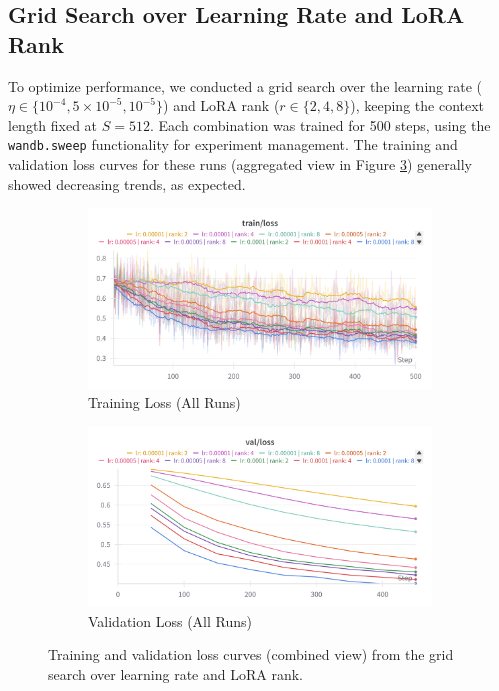 \documentclass{article}
\begin{document}
\subsection{Grid Search over Learning Rate and LoRA Rank}

To optimize performance, we conducted a grid search over the learning rate ($\eta \in \{10^{-4}, 5 \times 10^{-5}, 10^{-5}\}$) and LoRA rank ($r \in \{2, 4, 8\}$), keeping the context length fixed at $S=512$. Each combination was trained for 500 steps, using the \texttt{wandb.sweep} functionality for experiment management. The training and validation loss curves for these runs (aggregated view in Figure \ref{fig:grid_search_lr_rank_loss_curves}) generally showed decreasing trends, as expected.

\begin{figure}[!htbp] 
    \centering 
    \begin{subfigure}[b]{0.48\linewidth} 
        \centering
        \includegraphics[width=\linewidth]{M2 Course Work//Images/grid_search_training_loss.png}
        \caption{Training Loss (All Runs)} %
        \label{fig:grid_search_lr_rank_train_loss} %
    \end{subfigure}
    \hfill 
    \begin{subfigure}[b]{0.48\linewidth}
        \centering
        \includegraphics[width=\linewidth]{M2 Course Work//Images/grid_search_validiation_loss.png}
        \caption{Validation Loss (All Runs)} %
        \label{fig:grid_search_lr_rank_valid_loss} %
    \end{subfigure}
    \caption{Training and validation loss curves (combined view) from the grid search over learning rate and LoRA rank.}
    \label{fig:grid_search_lr_rank_loss_curves} %
\end{figure}
\end{document}
